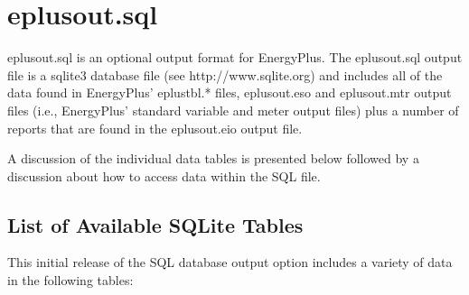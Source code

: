 \section{eplusout.sql}

eplusout.sql is an optional output format for EnergyPlus. The eplusout.sql output file is a sqlite3 database file (see http://www.sqlite.org) and includes all of the data found in EnergyPlus’ eplustbl.* files, eplusout.eso and eplusout.mtr output files (i.e., EnergyPlus’ standard variable and meter output files) plus a number of reports that are found in the eplusout.eio output file.

A discussion of the individual data tables is presented below followed by a discussion about how to access data within the SQL file.

\subsection{List of Available SQLite Tables}

This initial release of the SQL database output option includes a variety of data in the following tables:

